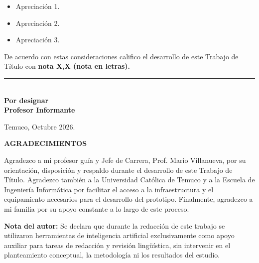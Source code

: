 \documentclass[12pt,oneside,openany,spanish,oldfontcommands]{memoir}
\begin{document}
\begin{itemize}
  \item Apreciación 1.
  \item Apreciación 2.
  \item Apreciación 3.
\end{itemize}

De acuerdo con estas consideraciones califico el desarrollo de este Trabajo de Título con
\textbf{nota X,X (nota en letras).}

\vspace{1cm}

\begin{flushright}
\rule{65mm}{0.2mm}\\
\textbf{Por designar}\\
\textbf{Profesor Informante}
\end{flushright}

\vspace{1cm}

Temuco, Octubre 2026.

\clearpage
\thispagestyle{empty}

\begin{center}
  \textbf{AGRADECIMIENTOS}
\end{center}

\vspace{1cm}

Agradezco a mi profesor guía y Jefe de Carrera, Prof. Mario Villanueva, por su orientación,
disposición y respaldo durante el desarrollo de este Trabajo de Título. Agradezco también a
la Universidad Católica de Temuco y a la Escuela de Ingeniería Informática por facilitar el
acceso a la infraestructura y el equipamiento necesarios para el desarrollo del prototipo.
Finalmente, agradezco a mi familia por su apoyo constante a lo largo de este proceso.

\vfill

\noindent\textbf{Nota del autor:} \small Se declara que durante la redacción de este trabajo se utilizaron herramientas de inteligencia artificial exclusivamente como apoyo auxiliar para tareas de redacción y revisión lingüística, sin intervenir en el planteamiento conceptual, la metodología ni los resultados del estudio.

\clearpage
{}
\pagestyle{empty}
\end{document}
